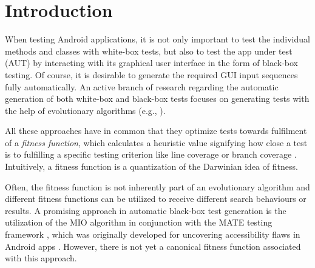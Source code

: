 \documentclass[
  a4paper,  %
  twoside,  %
  bibliography=totoc,
  headsepline,
  cleardoublepage=empty,
  parskip=half,
  draft=false
]{scrbook}
\begin{document}


\renewcommand*{\chapterpagestyle}{scrplain}
\pagestyle{scrheadings}
\pagestyle{scrheadings}
\ihead[]{}
\chead[]{}
\ohead[]{\headmark}
\cfoot[]{}
\ifoot[]{}

































%
%


\chapter{Introduction}
When testing Android applications, it is not only important to test the individual methods and classes with white-box tests, but also to test the app under test (AUT) by interacting with its graphical user interface in the form of black-box testing.
Of course, it is desirable to generate the required GUI input sequences fully automatically.
An active branch of research regarding the automatic generation of both white-box and black-box tests focuses on generating tests with the help of evolutionary  algorithms (e.g., \cite{mao2016sapienz, panichella2017automated, fraser2012whole, arcuri2018test, panichella2015reformulating}).

All these approaches have in common that they optimize tests towards fulfilment of a \emph{fitness function}, which calculates a heuristic value signifying how close a test is to fulfilling a specific testing criterion like line coverage or branch coverage \cite{mcminn2004search}.
Intuitively, a fitness function is a quantization of the Darwinian idea of fitness.

Often, the fitness function is not inherently part of an evolutionary algorithm and different fitness functions can be utilized to receive different search behaviours or results.
A promising approach in automatic black-box test generation is the utilization of the MIO algorithm \cite{arcuri2018test} in conjunction with the MATE testing framework \cite{MATE}, which was originally developed for uncovering accessibility flaws in Android apps \cite{eler2018automated}.
However, there is not yet a canonical fitness function associated with this approach.
\end{document}
